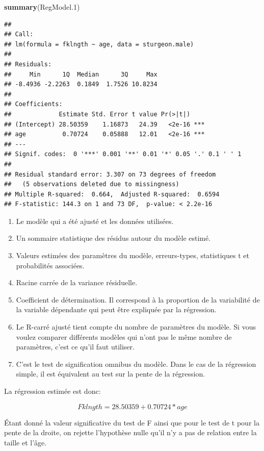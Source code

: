 \documentclass[12pt,]{book}
\newenvironment{Shaded}{\begin{snugshade}}{\end{snugshade}}
\newcommand{\FloatTok}[1]{\textcolor[rgb]{0.06,0.06,0.06}{#1}}
\newcommand{\KeywordTok}[1]{\textcolor[rgb]{0.27,0.27,0.27}{\textbf{#1}}}
\newcommand{\NormalTok}[1]{#1}
\providecommand{\tightlist}{%
  \setlength{\itemsep}{0pt}\setlength{\parskip}{0pt}}
\begin{document}
\begin{Shaded}
\begin{Highlighting}[]
\KeywordTok{summary}\NormalTok{(RegModel}\FloatTok{.1}\NormalTok{)}
\end{Highlighting}
\end{Shaded}

\begin{verbatim}
## 
## Call:
## lm(formula = fklngth ~ age, data = sturgeon.male)
## 
## Residuals:
##     Min      1Q  Median      3Q     Max 
## -8.4936 -2.2263  0.1849  1.7526 10.8234 
## 
## Coefficients:
##             Estimate Std. Error t value Pr(>|t|)    
## (Intercept) 28.50359    1.16873   24.39   <2e-16 ***
## age          0.70724    0.05888   12.01   <2e-16 ***
## ---
## Signif. codes:  0 '***' 0.001 '**' 0.01 '*' 0.05 '.' 0.1 ' ' 1
## 
## Residual standard error: 3.307 on 73 degrees of freedom
##   (5 observations deleted due to missingness)
## Multiple R-squared:  0.664,	Adjusted R-squared:  0.6594 
## F-statistic: 144.3 on 1 and 73 DF,  p-value: < 2.2e-16
\end{verbatim}

\begin{enumerate}
\def\labelenumi{\arabic{enumi}.}
\tightlist
\item
  Le modèle qui a été ajusté et les données utilisées.
\item
  Un sommaire statistique des résidus autour du modèle estimé.
\item
  Valeurs estimées des paramètres du modèle, erreurs-types, statistiques t et probabilités associées.
\item
  Racine carrée de la variance résiduelle.
\item
  Coefficient de détermination. Il correspond à la proportion de la variabilité de la variable dépendante qui peut être expliquée par la régression.
\item
  Le R-carré ajusté tient compte du nombre de paramètres du modèle. Si vous voulez comparer différents modèles qui n'ont pas le même nombre de paramètres, c'est ce qu'il faut utiliser.
\item
  C'est le test de signification omnibus du modèle. Dans le cas de la régression simple, il est équivalent au test sur la pente de la régression.
\end{enumerate}

La régression estimée est donc:

\[ Fklngth = 28.50359 + 0.70724 * age\]

Étant donné la valeur significative du test de F ainsi que pour le test de t pour la pente de la droite, on rejette l'hypothèse nulle qu'il n'y a pas de relation entre la taille et l'âge.
\end{document}
